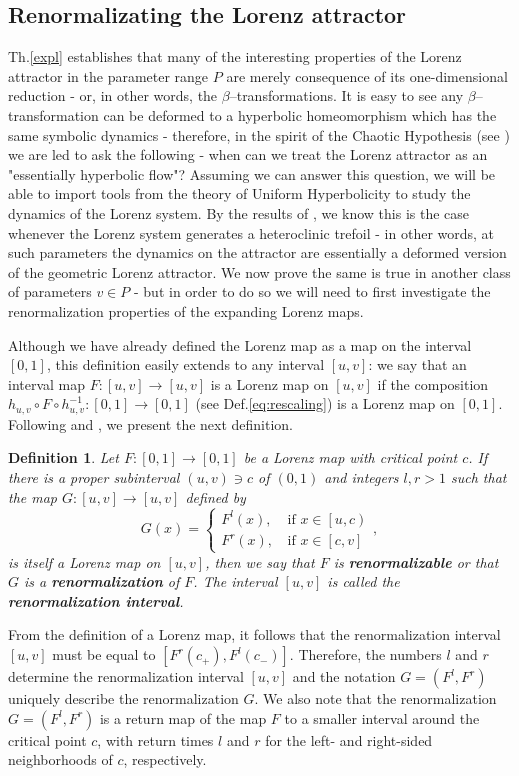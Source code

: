 \documentclass[10pt,reqno]{amsart}
\theoremstyle{plain}
\newtheorem{definition}{Definition}[section]
\theoremstyle{assumption}
\theoremstyle{notation}
\theoremstyle{claim}
\theoremstyle{conj}
\theoremstyle{theorem}
\theoremstyle{proposition}
\theoremstyle{corollary}
\begin{document}
\subsection{Renormalizating the Lorenz attractor}
\label{renorsec}
Th.\ref{expl} establishes that many of the interesting properties of the Lorenz attractor in the parameter range $P$ are merely consequence of its one-dimensional reduction - or, in other words, the $\beta$--transformations. It is easy to see any $\beta$--transformation can be deformed to a hyperbolic homeomorphism which has the same symbolic dynamics - therefore, in the spirit of the Chaotic Hypothesis (see \cite{gal}) we are led to ask the following - when can we treat the Lorenz attractor as an "essentially hyperbolic flow"? Assuming we can answer this question, we will be able to import tools from the theory of Uniform Hyperbolicity to study the dynamics of the Lorenz system. By the results of \cite{Pi}, we know this is the case whenever the Lorenz system generates a heteroclinic trefoil - in other words, at such parameters the dynamics on the attractor are essentially a deformed version of the geometric Lorenz attractor. We now prove the same is true in another class of parameters $v\in P$ - but in order to do so we will need to first investigate the renormalization properties of the expanding Lorenz maps.

Although we have already defined the Lorenz map as a map on the interval $[0,1]$, this definition easily extends to any interval $[u,v]$: we say that an interval map $F\colon[u,v]\to[u,v]$ is a Lorenz map on $[u, v]$ if the composition $h_{u,v}\circ F\circ h^{-1}_{u,v}\colon[0,1]\to[0,1]$ (see Def.\eqref{eq:rescaling}) is a Lorenz map on $[0,1]$. Following \cite{Ding} and \cite{DiCui}, we present the next definition.

\begin{definition}
    \label{defn:renormalization}
Let $F\colon[0,1]\to[0,1]$ be a Lorenz map with critical point $c$. If there is a proper subinterval $(u, v) \ni c$ of $(0,1)$ and integers $l, r > 1$ such that the map $G\colon [u, v]\to [u, v]$ defined by
	\begin{equation*}
	G(x)=\begin{cases}F^l (x),\,&\text{if 
		$x\in\left[u,c\right)$}\\
	F^r (x),\,&\text{if $x\in [c,v]$}\end{cases},
	\end{equation*}
is itself a Lorenz map on $[u, v]$, then we say that $F$ is \textbf{renormalizable} or that $G$ is a \textbf{renormalization} of $F$. The interval $[u, v]$ is called the \textbf{renormalization interval}. 
\end{definition}
From the definition of a Lorenz map, it follows that the renormalization interval $[u, v]$ must be equal to $[F^r(c_+),F^l(c_-)]$. Therefore, the numbers $l$ and $r$ determine the renormalization interval $[u, v]$ and the notation $G=(F^l,F^r)$ uniquely describe the renormalization $G$. We also note that the renormalization $G=(F^l,F^r)$ is a return map of the map $F$ to a smaller interval around the critical point $c$, with return times $l$ and $r$ for the left- and right-sided neighborhoods of $c$, respectively. 
\end{document}
